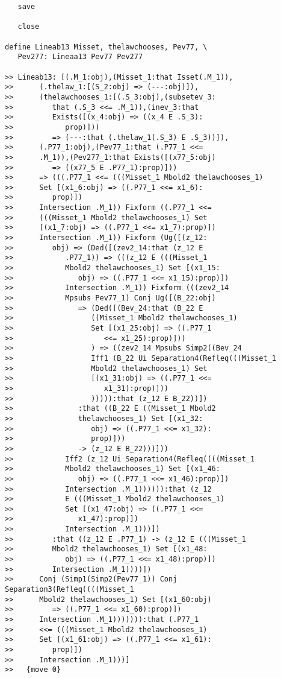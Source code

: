 \documentclass[12pt]{article}
\begin{document}
\begin{verbatim}
   save

   close

define Lineab13 Misset, thelawchooses, Pev77, \
   Pev277: Lineaa13 Pev77 Pev277

>> Lineab13: [(.M_1:obj),(Misset_1:that Isset(.M_1)),
>>      (.thelaw_1:[(S_2:obj) => (---:obj)]),
>>      (thelawchooses_1:[(.S_3:obj),(subsetev_3:
>>         that (.S_3 <<= .M_1)),(inev_3:that
>>         Exists([(x_4:obj) => ((x_4 E .S_3):
>>            prop)]))
>>         => (---:that (.thelaw_1(.S_3) E .S_3))]),
>>      (.P77_1:obj),(Pev77_1:that (.P77_1 <<=
>>      .M_1)),(Pev277_1:that Exists([(x77_5:obj)
>>         => ((x77_5 E .P77_1):prop)]))
>>      => (((.P77_1 <<= (((Misset_1 Mbold2 thelawchooses_1)
>>      Set [(x1_6:obj) => ((.P77_1 <<= x1_6):
>>         prop)])
>>      Intersection .M_1)) Fixform ((.P77_1 <<=
>>      (((Misset_1 Mbold2 thelawchooses_1) Set
>>      [(x1_7:obj) => ((.P77_1 <<= x1_7):prop)])
>>      Intersection .M_1)) Fixform (Ug([(z_12:
>>         obj) => (Ded([(zev2_14:that (z_12 E
>>            .P77_1)) => (((z_12 E (((Misset_1
>>            Mbold2 thelawchooses_1) Set [(x1_15:
>>               obj) => ((.P77_1 <<= x1_15):prop)])
>>            Intersection .M_1)) Fixform (((zev2_14
>>            Mpsubs Pev77_1) Conj Ug([(B_22:obj)
>>               => (Ded([(Bev_24:that (B_22 E
>>                  ((Misset_1 Mbold2 thelawchooses_1)
>>                  Set [(x1_25:obj) => ((.P77_1
>>                     <<= x1_25):prop)]))
>>                  ) => ((zev2_14 Mpsubs Simp2((Bev_24
>>                  Iff1 (B_22 Ui Separation4(Refleq(((Misset_1
>>                  Mbold2 thelawchooses_1) Set
>>                  [(x1_31:obj) => ((.P77_1 <<=
>>                     x1_31):prop)]))
>>                  ))))):that (z_12 E B_22))])
>>               :that ((B_22 E ((Misset_1 Mbold2
>>               thelawchooses_1) Set [(x1_32:
>>                  obj) => ((.P77_1 <<= x1_32):
>>                  prop)]))
>>               -> (z_12 E B_22)))]))
>>            Iff2 (z_12 Ui Separation4(Refleq((((Misset_1
>>            Mbold2 thelawchooses_1) Set [(x1_46:
>>               obj) => ((.P77_1 <<= x1_46):prop)])
>>            Intersection .M_1)))))):that (z_12
>>            E (((Misset_1 Mbold2 thelawchooses_1)
>>            Set [(x1_47:obj) => ((.P77_1 <<=
>>               x1_47):prop)])
>>            Intersection .M_1)))])
>>         :that ((z_12 E .P77_1) -> (z_12 E (((Misset_1
>>         Mbold2 thelawchooses_1) Set [(x1_48:
>>            obj) => ((.P77_1 <<= x1_48):prop)])
>>         Intersection .M_1))))])
>>      Conj (Simp1(Simp2(Pev77_1)) Conj Separation3(Refleq((((Misset_1
>>      Mbold2 thelawchooses_1) Set [(x1_60:obj)
>>         => ((.P77_1 <<= x1_60):prop)])
>>      Intersection .M_1))))))):that (.P77_1
>>      <<= (((Misset_1 Mbold2 thelawchooses_1)
>>      Set [(x1_61:obj) => ((.P77_1 <<= x1_61):
>>         prop)])
>>      Intersection .M_1)))]
>>   {move 0}




\end{verbatim}
\end{document}
